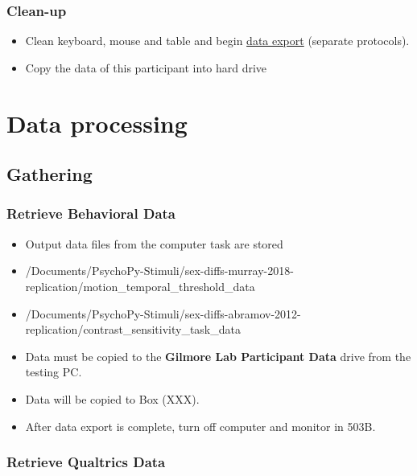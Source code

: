 \documentclass[]{article}
\providecommand{\tightlist}{%
  \setlength{\itemsep}{0pt}\setlength{\parskip}{0pt}}
\begin{document}
\subsubsection{Clean-up}\label{clean-up}

\begin{itemize}
\tightlist
\item
  Clean keyboard, mouse and table and begin
  \href{sex-differences-data-export.md}{data export} (separate
  protocols).
\item
  Copy the data of this participant into hard drive
\end{itemize}

\section{Data processing}\label{data-processing}

\subsection{Gathering}\label{gathering}

\subsubsection{Retrieve Behavioral Data}\label{retrieve-behavioral-data}

\begin{itemize}
\item
  Output data files from the computer task are stored
\item
  /Documents/PsychoPy-Stimuli/sex-diffs-murray-2018-replication/motion\_temporal\_threshold\_data
\item
  /Documents/PsychoPy-Stimuli/sex-diffs-abramov-2012-replication/contrast\_sensitivity\_task\_data
\item
  Data must be copied to the \textbf{Gilmore Lab Participant Data} drive
  from the testing PC.
\item
  Data will be copied to Box (XXX).
\item
  After data export is complete, turn off computer and monitor in 503B.
\end{itemize}

\subsubsection{Retrieve Qualtrics Data}\label{retrieve-qualtrics-data}
\end{document}
